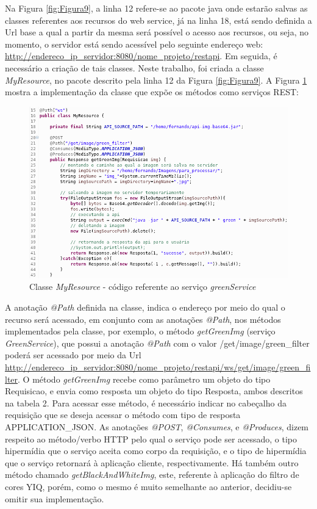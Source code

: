 \documentclass[12pt]{article}
\begin{document}
Na Figura \ref{fig:Figura9}, a linha 12 refere-se ao pacote java onde estarão salvas as classes referentes aos recursos do web service, já na linha 18, está sendo definida a Url base a qual a partir da mesma será possível o acesso aos recursos, ou seja, no momento, o servidor está sendo acessível pelo seguinte endereço web: \url{http://endereco_ip_servidor:8080/nome_projeto/restapi}.
Em seguida, é necessário a criação de tais classes. Neste trabalho, foi criada a classe \textit{MyResource}, no pacote descrito pela linha 12 da Figura \ref{fig:Figura9}. A Figura \ref{fig:Figura10} mostra a implementação da classe que expõe os métodos como serviços REST:

\begin{figure}[ht]
	\centering
	\includegraphics[width=.9\textwidth]{codigo-green-service.png}
	\caption{Classe \textit{MyResource} - código referente ao serviço \textit{greenService}}
	\label{fig:Figura10}
\end{figure}

A anotação \textit{@Path} definida na classe, indica o endereço por meio do qual o recurso será acessado, em conjunto com as anotações \textit{@Path}, nos métodos implementados pela classe, por exemplo, o método \textit{getGreenImg} (serviço \textit{GreenService}), que possui a anotação \textit{@Path} com o valor /get/image/green\_filter poderá ser acessado por meio da Url \url{http://endereco_ip_servidor:8080/nome_projeto/restapi/ws/get/image/green_filter}.
 O método \textit{getGreenImg} recebe como parâmetro um objeto do tipo Requisicao, e envia como resposta um objeto do tipo Resposta, ambos descritos na tabela 2. Para acessar esse método, é necessário indicar no cabeçalho da requisição que se deseja acessar o método com tipo de resposta APPLICATION\_JSON. As anotações \textit{@POST}, \textit{@Consumes}, e \textit{@Produces}, dizem respeito ao método/verbo HTTP pelo qual o serviço pode ser acessado, o tipo hipermídia que o serviço aceita como corpo da requisição, e o tipo de hipermídia que o serviço retornará à aplicação cliente, respectivamente. Há também outro método chamado \textit{getBlackAndWhiteImg}, este, referente à aplicação do filtro de cores YIQ, porém, como o mesmo é muito semelhante ao anterior, decidiu-se omitir sua implementação.
\end{document}
